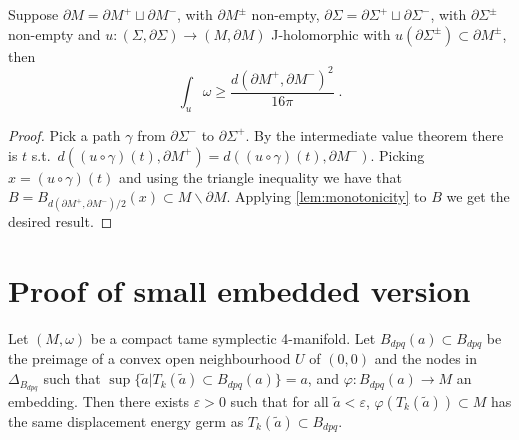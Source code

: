 \documentclass[12pt,a4paper,draft]{scrartcl}
\begin{document}
\begin{corollary}
  \label{cor:small_buffer}
  Suppose $∂M = ∂M^+ ⊔ ∂M^-$, with $∂M^±$ non-empty, $∂Σ = ∂Σ^+ ⊔ ∂Σ^-$, with $∂Σ^±$ non-empty and $u\colon (Σ,∂Σ) → (M,∂M)$ J-holomorphic with $u(∂Σ^±) ⊂ ∂M^±$, then
  \[∫_u ω ≥ \frac{d(∂M^+,∂M^-)^2}{16π} \; .\]
\end{corollary}

\begin{proof}
  Pick a path $γ$ from $∂Σ^-$ to $∂Σ^+$. By the intermediate value theorem there is $t$ s.t.\ $d((u ∘ γ) (t),∂M^+) = d((u ∘ γ)(t), ∂M^-)$. Picking $x = (u ∘ γ)(t)$ and using the triangle inequality we have that $B = B_{d(∂M^+,∂M^-)/2}(x) ⊂ M ∖ ∂M $. Applying \cref{lem:monotonicity} to $B$ we get the desired result.
\end{proof}

\section{Proof of small embedded version}


\begin{theorem}
  Let $(M,ω)$ be a compact tame symplectic 4-manifold. Let $B_{dpq}(a) ⊂ B_{dpq}$ be the preimage of a convex open neighbourhood $U$ of $(0,0)$ and the nodes in $Δ_{B_{dpq}}$ such that $\sup\{\tilde{a} | T_k(\tilde{a}) ⊂ B_{dpq}(a)\} = a$, and $φ \colon B_{dpq}(a) → M$ an embedding. Then there exists $ε>0$ such that for all $\tilde{a}<ε$, $φ(T_k(\tilde{a})) ⊂ M$ has the same displacement energy germ as $T_k(\tilde{a}) ⊂ B_{dpq}$.
\end{theorem}
\end{document}
